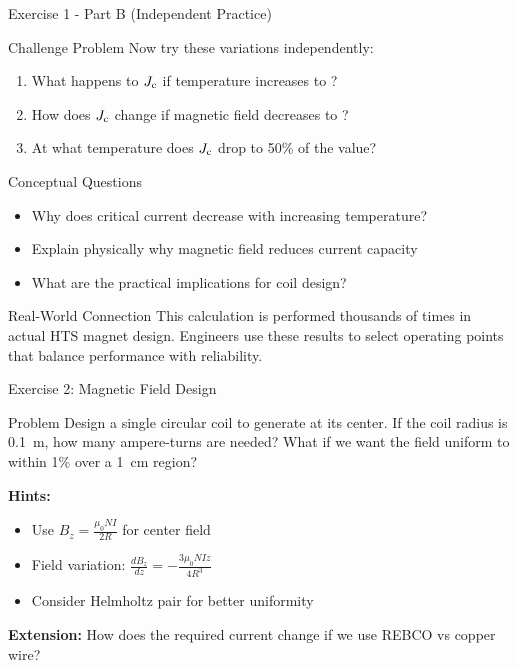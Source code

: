 \begin{frame}{Exercise 1 - Part B (Independent Practice)}
    \begin{block}{Challenge Problem}
        Now try these variations independently:
        \begin{enumerate}
            \item What happens to $J_\text{c}$ if temperature increases to ?
            \item How does $J_\text{c}$ change if magnetic field decreases to ?
            \item At what temperature does $J_\text{c}$ drop to 50\% of the  value?
        \end{enumerate}
    \end{block}
    
    \begin{block}{Conceptual Questions}
        \begin{itemize}
            \item Why does critical current decrease with increasing temperature?
            \item Explain physically why magnetic field reduces current capacity
            \item What are the practical implications for coil design?
        \end{itemize}
    \end{block}
    
    \begin{block}{Real-World Connection}
        This calculation is performed thousands of times in actual HTS magnet design. Engineers use these results to select operating points that balance performance with reliability.
    \end{block}
\end{frame}

\begin{frame}{Exercise 2: Magnetic Field Design}
    \begin{block}{Problem}
        Design a single circular coil to generate  at its center.
        If the coil radius is 0.1~m, how many ampere-turns are needed?
        What if we want the field uniform to within 1\% over a 1~cm region?
    \end{block}
    
    \vspace{0.3cm}
    \textbf{Hints:}
    \begin{itemize}
        \item Use $B_z = \frac{\mu_0 N I}{2 R}$ for center field
        \item Field variation: $\frac{dB_z}{dz} = -\frac{3\mu_0 N I z}{4 R^3}$
        \item Consider Helmholtz pair for better uniformity
    \end{itemize}
    
    \vspace{0.3cm}
    \textbf{Extension:} How does the required current change if we use REBCO vs copper wire?
\end{frame}

